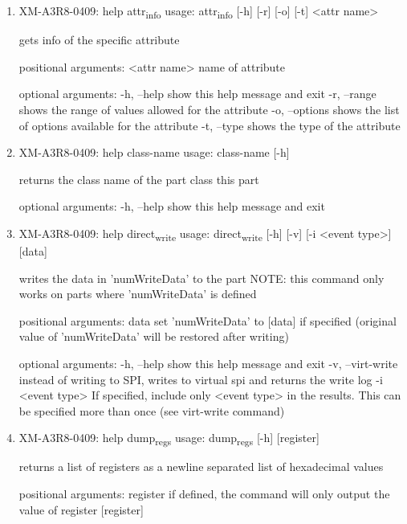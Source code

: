 \documentclass[11pt]{article}
\begin{document}
\begin{enumerate}
\item XM-A3R8-0409: help attr\textsubscript{info}
\label{sec:orgdb4320e}
usage: attr\textsubscript{info} [-h] [-r] [-o] [-t] <attr name>

gets info of the specific attribute

positional arguments:
  <attr name>    name of attribute

optional arguments:
  -h, --help     show this help message and exit
  -r, --range    shows the range of values allowed for the attribute
  -o, --options  shows the list of options available for the attribute
  -t, --type     shows the type of the attribute

\item XM-A3R8-0409: help class-name
\label{sec:org1d3b853}
usage: class-name [-h]

returns the class name of the part class this part

optional arguments:
  -h, --help  show this help message and exit

\item XM-A3R8-0409: help direct\textsubscript{write}
\label{sec:org6edeb23}
usage: direct\textsubscript{write} [-h] [-v] [-i <event type>] [data]

writes the data in 'numWriteData' to the part NOTE: this command only works on
parts where 'numWriteData' is defined

positional arguments:
  data              set 'numWriteData' to [data] if specified (original value
                    of 'numWriteData' will be restored after writing)

optional arguments:
  -h, --help        show this help message and exit
  -v, --virt-write  instead of writing to SPI, writes to virtual spi and
                    returns the write log
  -i <event type>   If specified, include only <event type> in the results.
                    This can be specified more than once (see virt-write
                    command)

\item XM-A3R8-0409: help dump\textsubscript{regs}
\label{sec:orge5e1f8f}
usage: dump\textsubscript{regs} [-h] [register]

returns a list of registers as a newline separated list of hexadecimal values

positional arguments:
  register    if defined, the command will only output the value of register
              [register]


\end{enumerate}
\end{document}
